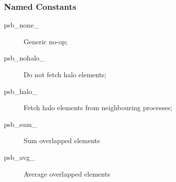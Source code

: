 \subsubsection{Named Constants}
\label{sec:cd_constants}
\begin{description}
\item[psb\_none\_] Generic no-op;
\item[psb\_nohalo\_]  Do not fetch halo elements;
\item[psb\_halo\_]  Fetch halo elements from neighbouring processes;
\item[psb\_sum\_] Sum overlapped elements
\item[psb\_avg\_] Average overlapped elements
\end{description}



